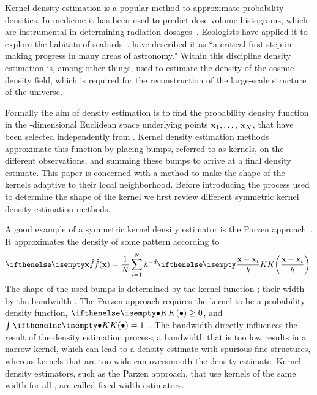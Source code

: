 Kernel density estimation is a popular method to approximate probability densities. In medicine it has been used to predict dose-volume histograms, which are instrumental in determining radiation dosages~\cite{SkarpmanDose2015}. Ecologists have applied it to explore the habitats of seabirds~\cite{lees2016using}. \textcite{ferdosi2011comparison} have described it as ``a critical first step in making progress in many areas of astronomy."  Within this discipline  density estimation is, among other things, used to estimate the density of the cosmic density field, which is required for the reconstruction of the large-scale structure of the universe.

Formally the aim of density estimation is to find the probability density function \varDensityFunction{\varPattern} in the \varDim-dimensional Euclidean space underlying \varNumPatterns points $\varPattern[1], \dotsc,\, \varPattern[\varNumPatterns]$, that have been selected independently from \varDensityFunction{\varPattern}. Kernel density estimation methods approximate this function by placing bumps, referred to as kernels, on the different observations, and summing these bumps to arrive at a final density estimate. This paper is concerned with a method to make the shape of the kernels adaptive to their local neighborhood. Before introducing the process used to determine the shape of the kernel we first review different symmetric kernel density estimation methods.

	A good example of a symmetric kernel density estimator is the Parzen approach~\cite{parzen1962estimation}. It approximates the density of some pattern \varPattern according to
	\begin{equation}\label{eq:1:parzen}
		\varEstimatedDensityFunction{\varPattern} = \frac{1}{\varNumPatterns}\sum_{\itXis = 1}^{\varNumPatterns} \varBandwidth^{-\varDim}\varKernel{\frac{\varPattern - \varPattern[\itXis]}{\varBandwidth}}.
	\end{equation}
	The shape of the used bumps is determined by the kernel function \varKernel{\bullet}; their width by the bandwidth \varBandwidth. The Parzen approach requires the kernel to be a probability density function, \ie $\varKernel{\bullet} \geq 0$, and $\int \varKernel{\bullet} = 1$~\cite{silverman1986density}.
	The bandwidth directly influences the result of the density estimation process; a bandwidth that is too low results in a narrow kernel, which can lead to a density estimate with spurious fine structures, whereas kernels that are too wide can oversmooth the density estimate. Kernel density estimators, such as the Parzen approach, that use kernels of the same width for all \varPattern[\itXis], are called fixed-width estimators.

